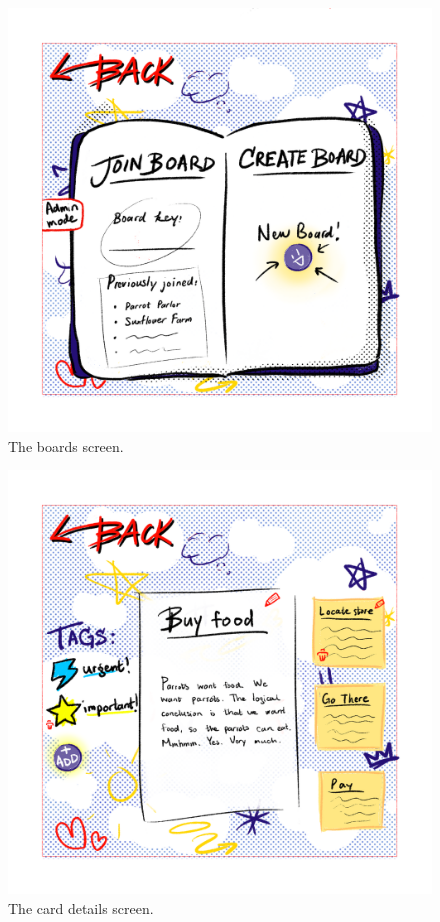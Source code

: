 \begin{figure}
    \includegraphics{mocks/hue_mock_boards.png}
    \caption{The boards screen.}
\end{figure}
\begin{figure}
    \includegraphics{mocks/hue_mock_card_details.png}
    \caption{The card details screen.}
\end{figure}